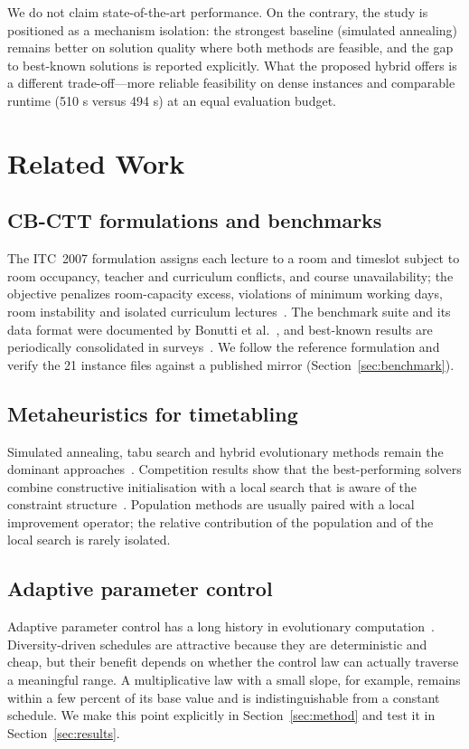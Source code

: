 \documentclass[journal]{IEEEtran}
\begin{document}
We do not claim state-of-the-art performance. On the contrary, the study is positioned as a mechanism isolation: the strongest baseline (simulated annealing) remains better on solution quality where both methods are feasible, and the gap to best-known solutions is reported explicitly. What the proposed hybrid offers is a different trade-off---more reliable feasibility on dense instances and comparable runtime (510 s versus 494 s) at an equal evaluation budget.

\section{Related Work}
\subsection{CB-CTT formulations and benchmarks}
The ITC~2007 formulation assigns each lecture to a room and timeslot subject to room occupancy, teacher and curriculum conflicts, and course unavailability; the objective penalizes room-capacity excess, violations of minimum working days, room instability and isolated curriculum lectures~\cite{mccollum2009setting}. The benchmark suite and its data format were documented by Bonutti et al.~\cite{bonutti2012benchmarking}, and best-known results are periodically consolidated in surveys~\cite{ceschia2022educational}. We follow the reference formulation and verify the 21 instance files against a published mirror (Section~\ref{sec:benchmark}).

\subsection{Metaheuristics for timetabling}
Simulated annealing, tabu search and hybrid evolutionary methods remain the dominant approaches~\cite{sylejmani2022simulated,rezaeipanah2021hybrid,lacerda2021systematic}. Competition results show that the best-performing solvers combine constructive initialisation with a local search that is aware of the constraint structure~\cite{song2021competition}. Population methods are usually paired with a local improvement operator; the relative contribution of the population and of the local search is rarely isolated.

\subsection{Adaptive parameter control}
Adaptive parameter control has a long history in evolutionary computation~\cite{eiben1999parameter,goldberg1989genetic}. Diversity-driven schedules are attractive because they are deterministic and cheap, but their benefit depends on whether the control law can actually traverse a meaningful range. A multiplicative law with a small slope, for example, remains within a few percent of its base value and is indistinguishable from a constant schedule. We make this point explicitly in Section~\ref{sec:method} and test it in Section~\ref{sec:results}.
\end{document}

